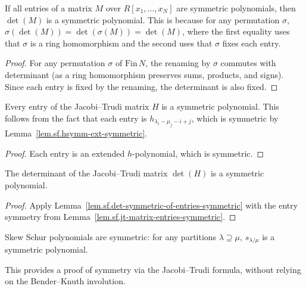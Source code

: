 \begin{lemma}
\label{lem.sf.det-symmetric-of-entries-symmetric}
\leanhelper
\leanok
If all entries of a matrix $M$ over $R[x_1, \ldots, x_N]$ are symmetric
polynomials, then $\det(M)$ is a symmetric polynomial.
This is because for any permutation $\sigma$,
$\sigma(\det(M)) = \det(\sigma(M)) = \det(M)$,
where the first equality uses that $\sigma$ is a ring homomorphism and
the second uses that $\sigma$ fixes each entry.
\end{lemma}

\begin{proof}
For any permutation $\sigma$ of $\mathrm{Fin}\,N$,
the renaming by $\sigma$ commutes with determinant (as a ring homomorphism
preserves sums, products, and signs). Since each entry is fixed by
the renaming, the determinant is also fixed.
\end{proof}

\begin{lemma}
\label{lem.sf.jt-matrix-entries-symmetric}
\leanhelper
\leanok
Every entry of the Jacobi--Trudi matrix $H$ is a symmetric polynomial.
This follows from the fact that each entry is $h_{\lambda_i - \mu_j - i + j}$,
which is symmetric by Lemma~\ref{lem.sf.hsymm-ext-symmetric}.
\end{lemma}

\begin{proof}
\leanok
Each entry is an extended $h$-polynomial, which is symmetric.
\end{proof}

\begin{theorem}
\label{thm.sf.jt-matrix-det-symmetric}
\leanhelper
\leanok
The determinant of the Jacobi--Trudi matrix $\det(H)$ is a symmetric
polynomial.
\end{theorem}

\begin{proof}
\leanok
Apply Lemma~\ref{lem.sf.det-symmetric-of-entries-symmetric} with
the entry symmetry from Lemma~\ref{lem.sf.jt-matrix-entries-symmetric}.
\end{proof}

\begin{theorem}
\label{thm.sf.skew-schur-symm-jt}
\leanhelper
\leanok
Skew Schur polynomials are symmetric: for any partitions
$\lambda \supseteq \mu$, $s_{\lambda/\mu}$ is a symmetric polynomial.

This provides a proof of symmetry via the Jacobi--Trudi formula,
without relying on the Bender--Knuth involution.
\end{theorem}


